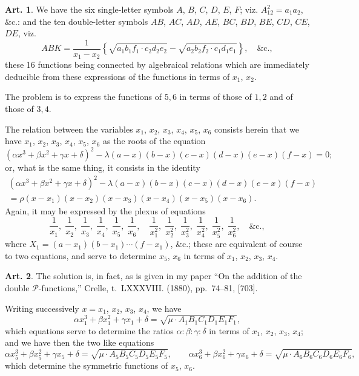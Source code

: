 \documentclass[11pt,a4paper]{article}
\theoremstyle{definition}
\newtheorem{art}{Art.}[section]
\begin{document}
\begin{art}
We have the six single-letter symbols $A$, $B$, $C$, $D$, $E$, $F$; viz. $A_{12}^2 = a_1a_2$, \&c.: and the ten double-letter symbols $AB$, $AC$, $AD$, $AE$, $BC$, $BD$, $BE$, $CD$, $CE$, $DE$, viz.
\[
ABK = \frac{1}{x_1-x_2}\left\{\sqrt{a_1b_1f_1 \cdot c_2d_2e_2} - \sqrt{a_2b_2f_2 \cdot c_1d_1e_1}\right\}, \quad \text{\&c.},
\]
these 16 functions being connected by algebraical relations which are immediately deducible from these expressions of the functions in terms of $x_1$, $x_2$.

The problem is to express the functions of $5,6$ in terms of those of $1,2$ and of those of $3,4$.

The relation between the variables $x_1$, $x_2$, $x_3$, $x_4$, $x_5$, $x_6$ consists herein that we have $x_1$, $x_2$, $x_3$, $x_4$, $x_5$, $x_6$ as the roots of the equation
\[
(\alpha x^3 + \beta x^2 + \gamma x + \delta)^2 - \lambda(a-x)(b-x)(c-x)(d-x)(e-x)(f-x) = 0;
\]
or, what is the same thing, it consists in the identity
\begin{multline*}
(\alpha x^3 + \beta x^2 + \gamma x + \delta)^2 - \lambda(a-x)(b-x)(c-x)(d-x)(e-x)(f-x) \\
= \rho(x-x_1)(x-x_2)(x-x_3)(x-x_4)(x-x_5)(x-x_6).
\end{multline*}
Again, it may be expressed by the plexus of equations
\[
\frac{1}{x_1},\; \frac{1}{x_2},\; \frac{1}{x_3},\; \frac{1}{x_4},\; \frac{1}{x_5},\; \frac{1}{x_6}, \quad
\frac{1}{x_1^2},\; \frac{1}{x_2^2},\; \frac{1}{x_3^2},\; \frac{1}{x_4^2},\; \frac{1}{x_5^2},\; \frac{1}{x_6^2}, \quad \&\text{c.},
\]
where $X_1 = (a-x_1)(b-x_1)\cdots(f-x_1)$, \&c.; these are equivalent of course to two equations, and serve to determine $x_5$, $x_6$ in terms of $x_1$, $x_2$, $x_3$, $x_4$.
\end{art}

\begin{art}
The solution is, in fact, as is given in my paper ``On the addition of the double $\mathcal{P}$-functions,'' Crelle, t.~LXXXVIII. (1880), pp.~74--81, [703].

Writing successively $x = x_1$, $x_2$, $x_3$, $x_4$, we have
\[
\alpha x_1^3 + \beta x_1^2 + \gamma x_1 + \delta = \sqrt{\mu \cdot A_1 B_1 C_1 D_1 E_1 F_1},
\]
which equations serve to determine the ratios $\alpha:\beta:\gamma:\delta$ in terms of $x_1$, $x_2$, $x_3$, $x_4$; and we have then the two like equations
\[
\alpha x_5^3 + \beta x_5^2 + \gamma x_5 + \delta = \sqrt{\mu \cdot A_5 B_5 C_5 D_5 E_5 F_5}, \qquad
\alpha x_6^3 + \beta x_6^2 + \gamma x_6 + \delta = \sqrt{\mu \cdot A_6 B_6 C_6 D_6 E_6 F_6},
\]
which determine the symmetric functions of $x_5$, $x_6$.
\end{art}
\end{document}
